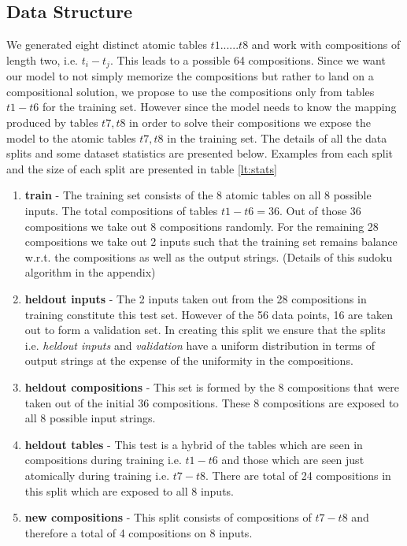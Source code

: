 
\subsection{Data Structure}\label{lt:splits}
We generated eight distinct atomic tables $t1......t8$ and work with compositions of length two, i.e. $t_i - t_j$. This leads to a possible 64 compositions. Since we want our model to not simply memorize the compositions but rather to land on a compositional solution, we propose to use the compositions only from tables $t1 - t6$ for the training set. However since the model needs to know the mapping produced by tables $t7, t8$ in order to solve their compositions we expose the model to the atomic tables $t7, t8$ in the training set. The details of all the data splits and some dataset statistics are presented below. Examples from each split and the size of each split are presented in table \ref{lt:stats}

\begin{enumerate}
	\item \textbf{train} - The training set consists of the 8 atomic tables on all 8 possible inputs. The total compositions of tables $t1 - t6 = 36$. Out of those 36 compositions we take out 8 compositions randomly. For the remaining 28 compositions we take out 2 inputs such that the training set remains balance w.r.t. the compositions as well as the output strings. (Details of this sudoku algorithm in the appendix)
	\item \textbf{heldout inputs} - The 2 inputs taken out from the 28 compositions in training constitute this test set. However of the 56 data points, 16 are taken out to form a validation set. In creating this split we ensure that the splits i.e. \textit{heldout inputs} and \textit{validation} have a uniform distribution in terms of output strings at the expense of the uniformity in the compositions.
	\item \textbf{heldout compositions} - This set is formed by the 8 compositions that were taken out of the initial 36 compositions. These 8 compositions are exposed to all 8 possible input strings.
	\item \textbf{heldout tables} - This test is a hybrid of the tables which are seen in compositions during training i.e. $t1 - t6$ and those which are seen just atomically during training i.e. $t7 - t8$. There are total of 24 compositions in this split which are exposed to all 8 inputs.
	\item \textbf{new compositions} - This split consists of compositions of $t7 - t8$ and therefore a total of 4 compositions on 8 inputs.
\end{enumerate}


